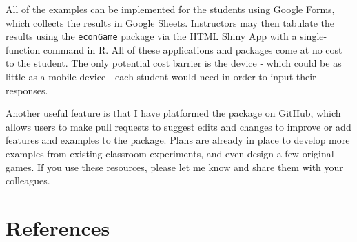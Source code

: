 \documentclass[
]{article}
\begin{document}
All of the examples can be implemented for the students using Google
Forms, which collects the results in Google Sheets. Instructors may then
tabulate the results using the \texttt{econGame} package via the HTML
Shiny App with a single-function command in R. All of these applications
and packages come at no cost to the student. The only potential cost
barrier is the device - which could be as little as a mobile device -
each student would need in order to input their responses.

Another useful feature is that I have platformed the package on GitHub,
which allows users to make pull requests to suggest edits and changes to
improve or add features and examples to the package. Plans are already
in place to develop more examples from existing classroom experiments,
and even design a few original games. If you use these resources, please
let me know and share them with your colleagues.

\hypertarget{references}{%
\section*{References}\label{references}}
\end{document}
